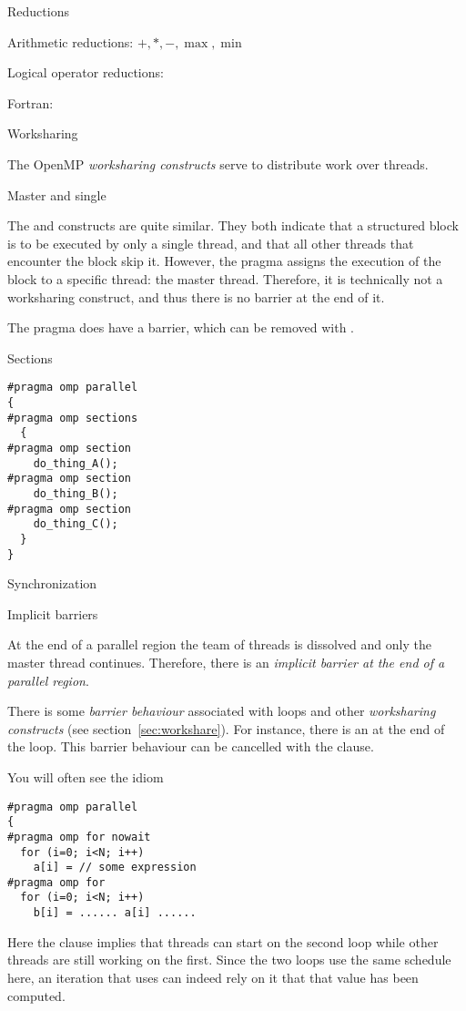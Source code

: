  {Reductions}

Arithmetic reductions: $+,*,-,\max,\min$

Logical operator reductions: \n{&,&&,|,||,^}

Fortran: 

 {Worksharing}

The OpenMP \emph{worksharing constructs} serve to distribute work
over threads.

 {Master and single}

The  and  constructs
are quite similar. They both indicate that a structured block
is to be executed by only a single thread, and that all other threads
that encounter the block skip it. However, the  pragma
assigns the execution of the block to a specific thread: the master thread.
Therefore, it is technically not a worksharing construct, and thus
there is no barrier at the end of it.

The  pragma does have a barrier, which can be removed with
.

 {Sections}

\begin{verbatim}
#pragma omp parallel
{
#pragma omp sections
  {
#pragma omp section
    do_thing_A();
#pragma omp section
    do_thing_B();
#pragma omp section
    do_thing_C();
  }
}
\end{verbatim}

 {Synchronization}

 {Implicit barriers}

At the end of a parallel region the team of threads is dissolved and
only the master thread continues. Therefore, there is an
\emph{implicit barrier at the end of a parallel region}.

There is some \emph{barrier behaviour} associated with  loops and other
\emph{worksharing constructs} (see section~\ref{sec:workshare}).  For instance, there
is an  at the end of the loop. This
barrier behaviour can be cancelled with the 
clause.

You will often see the idiom
\begin{verbatim}
#pragma omp parallel
{
#pragma omp for nowait
  for (i=0; i<N; i++)
    a[i] = // some expression
#pragma omp for
  for (i=0; i<N; i++)
    b[i] = ...... a[i] ......
\end{verbatim}
Here the  clause implies that threads can start on the second loop
while other threads are still working on the first. Since the two loops use the same
schedule here, an iteration that uses  can indeed rely on it that that 
value has been computed.

